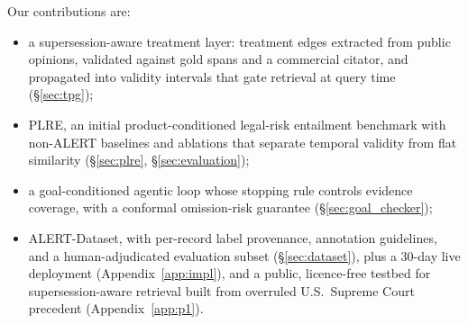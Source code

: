 Our contributions are:
\begin{itemize}[leftmargin=1.2em,itemsep=1pt,topsep=2pt]
  \item a supersession-aware treatment layer: treatment edges extracted from public opinions, validated against gold spans and a commercial citator, and propagated into validity intervals that gate retrieval at query time (\S\ref{sec:tpg});
  \item PLRE, an initial product-conditioned legal-risk entailment benchmark with non-ALERT baselines and ablations that separate temporal validity from flat similarity (\S\ref{sec:plre}, \S\ref{sec:evaluation});
  \item a goal-conditioned agentic loop whose stopping rule controls evidence coverage, with a conformal omission-risk guarantee (\S\ref{sec:goal_checker});
  \item ALERT-Dataset, with per-record label provenance, annotation guidelines, and a human-adjudicated evaluation subset (\S\ref{sec:dataset}), plus a 30-day live deployment (Appendix~\ref{app:impl}), and a public, licence-free testbed for supersession-aware retrieval built from overruled U.S.\ Supreme Court precedent (Appendix~\ref{app:p1}).
\end{itemize}
